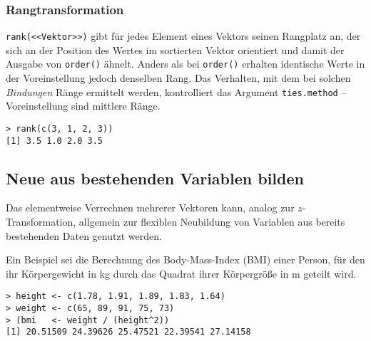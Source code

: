 \subsubsection{Rangtransformation}
\label{sec:transformRank}

\lstinline!rank(<<Vektor>>)! gibt für jedes Element eines Vektors seinen Rangplatz an, der sich an der Position des Wertes im sortierten Vektor orientiert und damit der Ausgabe von \lstinline!order()! ähnelt. Anders als bei \lstinline!order()! erhalten identische Werte in der Voreinstellung jedoch denselben Rang. Das Verhalten, mit dem bei solchen \emph{Bindungen} Ränge ermittelt werden, kontrolliert das Argument \lstinline!ties.method! -- Voreinstellung sind mittlere Ränge.
\begin{lstlisting}
> rank(c(3, 1, 2, 3))
[1] 3.5 1.0 2.0 3.5
\end{lstlisting}

\subsection{Neue aus bestehenden Variablen bilden}

Das elementweise Verrechnen mehrerer Vektoren kann, analog zur $z$-Transformation, allgemein zur flexiblen Neubildung von Variablen aus bereits bestehenden Daten genutzt werden.

Ein Beispiel sei die Berechnung des Body-Mass-Index (BMI) einer Person, für den ihr Körpergewicht in kg durch das Quadrat ihrer Körpergröße in m geteilt wird.
\begin{lstlisting}
> height <- c(1.78, 1.91, 1.89, 1.83, 1.64)
> weight <- c(65, 89, 91, 75, 73)
> (bmi   <- weight / (height^2))
[1] 20.51509 24.39626 25.47521 22.39541 27.14158
\end{lstlisting}

